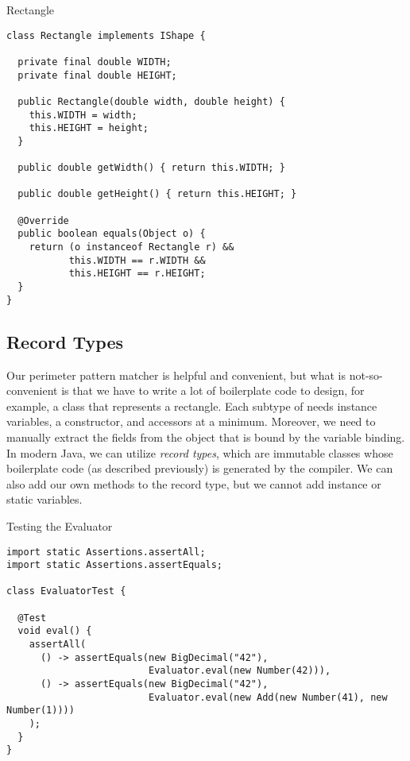 \begin{cl}{Rectangle}
\begin{lstlisting}[language=MyJava]
class Rectangle implements IShape {

  private final double WIDTH;
  private final double HEIGHT;

  public Rectangle(double width, double height) {
    this.WIDTH = width;
    this.HEIGHT = height;
  }

  public double getWidth() { return this.WIDTH; }

  public double getHeight() { return this.HEIGHT; }

  @Override
  public boolean equals(Object o) {
    return (o instanceof Rectangle r) &&
           this.WIDTH == r.WIDTH &&
           this.HEIGHT == r.HEIGHT;
  }
}
\end{lstlisting}
\end{cl}


\subsection*{Record Types}

Our perimeter pattern matcher is helpful and convenient, but what is not-so-convenient is that we have to write a lot of boilerplate code to design, for example, a class that represents a rectangle. Each subtype of  needs instance variables, a constructor, and accessors at a minimum. Moreover, we need to manually extract the fields from the object that is bound by the variable binding. In modern Java, we can utilize \textit{record types}, which are immutable classes whose boilerplate code (as described previously) is generated by the compiler. We can also add our own methods to the record type, but we cannot add instance or static variables.


\begin{cl}{Testing the Evaluator}
\begin{lstlisting}[language=MyJava]
import static Assertions.assertAll;
import static Assertions.assertEquals;

class EvaluatorTest {

  @Test
  void eval() {
    assertAll(
      () -> assertEquals(new BigDecimal("42"),
                         Evaluator.eval(new Number(42))),
      () -> assertEquals(new BigDecimal("42"),
                         Evaluator.eval(new Add(new Number(41), new Number(1))))
    );
  }
}
\end{lstlisting}
\end{cl}

